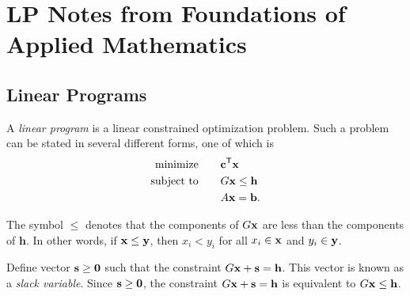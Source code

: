 \chapter{LP Notes from Foundations of Applied Mathematics}

%

\section*{Linear Programs} %

A \emph{linear program} is a linear constrained optimization problem. Such a problem can be stated in several
different forms, one of which is
\begin{align*}
\mbox{minimize}\qquad &\mathbf{c}^{\mathsf T} \mathbf{x} \\
\mbox{subject to}\qquad &G\mathbf{x} \leq \mathbf{h}\\
&A\mathbf{x} = \mathbf{b}.
\end{align*}

The symbol $\leq$ denotes that the components of $G\mathbf{x}$ are less than the components of $\mathbf{h}$. In other words, if $\mathbf{x}\leq\mathbf{y}$, then $x_i < y_i$ for all $x_i\in\mathbf{x}$ and $y_i\in\mathbf{y}$. 

Define vector $\mathbf{s} \geq \mathbf{0}$ such that the constraint $G\mathbf{x} + \mathbf{s} = \mathbf{h}$. 
This vector is known as a \emph{slack variable}. 
Since $\mathbf{s} \geq \mathbf{0}$, the constraint
$G\mathbf{x} + \mathbf{s} = \mathbf{h}$ is equivalent to $G\mathbf{x} \leq \mathbf{h}$.

